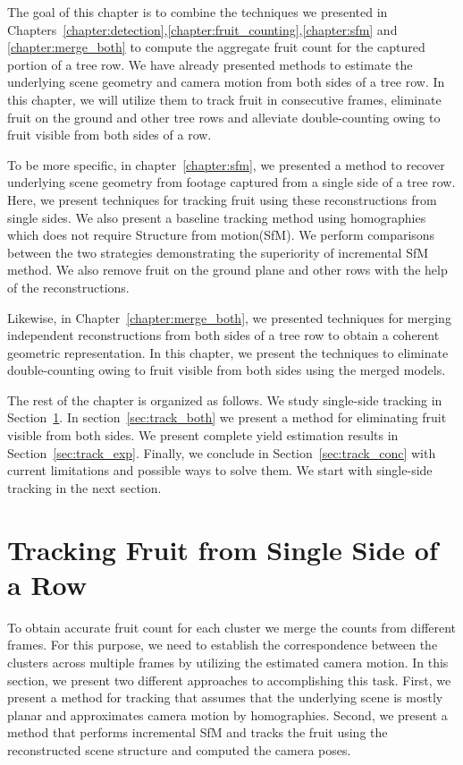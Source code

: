 The goal of this chapter is to combine the techniques we presented in Chapters~\ref{chapter:detection},\ref{chapter:fruit_counting},\ref{chapter:sfm} and \ref{chapter:merge_both} to compute the aggregate fruit count for the captured portion of a tree row. We have already presented methods to estimate the underlying scene geometry and camera motion from both sides of a tree row. In this chapter, we will utilize them to track fruit in consecutive frames, eliminate fruit on the ground and other tree rows and alleviate double-counting owing to fruit visible from both sides of a row. 


To be more specific, in chapter~\ref{chapter:sfm}, we presented a method to recover underlying scene geometry from footage captured from a single side of a tree row. Here, we present techniques for tracking fruit using these reconstructions from single sides. We also present a baseline tracking method using homographies which does not require Structure from motion(SfM). We perform comparisons between the two strategies demonstrating the superiority of incremental SfM method. We also remove fruit on the ground plane and other rows with the help of the reconstructions.

Likewise, in Chapter~\ref{chapter:merge_both}, we presented techniques for merging independent reconstructions from both sides of a tree row to obtain a coherent geometric representation. In this chapter, we present the techniques to eliminate double-counting owing to fruit visible from both sides using the merged models.


The rest of the chapter is organized as follows. We study single-side tracking in Section~\ref{sec:track_single}. In section~\ref{sec:track_both} we present a method for eliminating fruit visible from both sides. We present complete yield estimation results in Section~\ref{sec:track_exp}. Finally, we conclude in Section~\ref{sec:track_conc} with current limitations and possible ways to solve them. We start with single-side tracking in the next section.




\section{Tracking Fruit from Single Side of a Row}\label{sec:track_single}
To obtain accurate fruit count for each cluster we merge the counts from different frames. For this purpose, we need to establish the correspondence between the clusters across multiple frames by utilizing the estimated camera motion. In this section, we present two different approaches to accomplishing this task. First, we present a method for tracking that assumes that the underlying scene is mostly planar and approximates camera motion by homographies. Second, we present a method that performs incremental SfM and tracks the fruit using the reconstructed scene structure and computed the camera poses.


